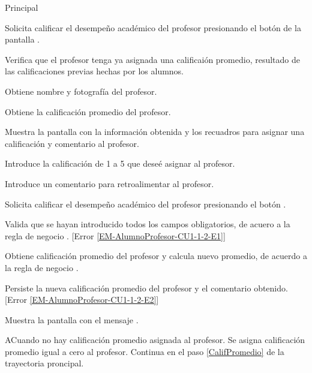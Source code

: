 \begin{UCtrayectoria}{Principal}

	\UCpaso [\UCactor] Solicita calificar el desempeño académico del profesor presionando el botón  de la pantalla .

	\UCpaso Verifica que el profesor tenga ya asignada una calificaión promedio, resultado de las calificaciones previas hechas por los alumnos. 

	\UCpaso Obtiene nombre y fotografía del profesor.  \label{CalifPromedio}

	\UCpaso Obtiene la calificación promedio del profesor. 

	\UCpaso Muestra la pantalla  con la información obtenida y los recuadros para asignar una calificación y comentario al profesor. 

	\UCpaso [\UCactor] Introduce la calificación de 1 a 5 que deseé asignar al profesor. \label{InfoObligatoria} 

	\UCpaso [\UCactor] Introduce un comentario para retroalimentar al profesor.

	\UCpaso [\UCactor] Solicita calificar el desempeño académico del profesor presionando el botón .

	\UCpaso Valida que se hayan introducido todos los campos obligatorios, de acuero a la regla de negocio . [Error \ref{EM-AlumnoProfesor-CU1-1-2-E1}]
	
	\UCpaso Obtiene calificación promedio del profesor y calcula nuevo promedio, de acuerdo a la regla de negocio . 
	
	\UCpaso Persiste la nueva calificación promedio del profesor y el comentario obtenido. [Error \ref{EM-AlumnoProfesor-CU1-1-2-E2}]

	\UCpaso Muestra la pantalla  con el mensaje .
\end{UCtrayectoria}

\begin{UCtrayectoriaA}{A}{Cuando no hay calificación promedio asignada al profesor.}
	\UCpaso	Se asigna calificación promedio igual a cero al profesor.
	\UCpaso Continua en el paso \ref{CalifPromedio} de la trayectoria proncipal.
\end{UCtrayectoriaA}


